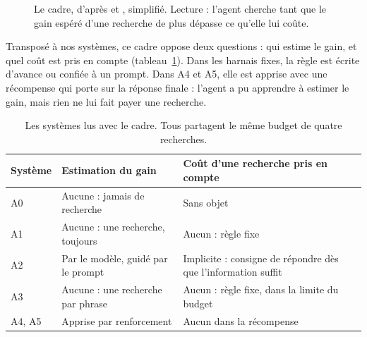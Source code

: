 \begin{figure}[ht]
\centering
{}
\caption{Le cadre, d'après \citet{pirolli1999information} et \citet{stigler1961economics}, simplifié. Lecture : l'agent cherche tant que le gain espéré d'une recherche de plus dépasse ce qu'elle lui coûte.}
\label{fig:cadre}
\end{figure}

Transposé à nos systèmes, ce cadre oppose deux questions : qui estime le gain, et quel coût est pris en compte (tableau~\ref{tab:cadre}). Dans les harnais fixes, la règle est écrite d'avance ou confiée à un prompt. Dans A4 et A5, elle est apprise avec une récompense qui porte sur la réponse finale \citep{jin2025search} : l'agent a pu apprendre à estimer le gain, mais rien ne lui fait payer une recherche.

\begin{table}[ht]
\centering\small
\begin{tabular}{@{}lp{5.6cm}p{5.6cm}@{}}
\toprule
Système & Estimation du gain & Coût d'une recherche pris en compte\\
\midrule
A0 & Aucune : jamais de recherche & Sans objet\\
A1 & Aucune : une recherche, toujours & Aucun : règle fixe\\
A2 & Par le modèle, guidé par le prompt & Implicite : consigne de répondre dès que l'information suffit\\
A3 & Aucune : une recherche par phrase & Aucun : règle fixe, dans la limite du budget\\
A4, A5 & Apprise par renforcement & Aucun dans la récompense\\
\bottomrule
\end{tabular}
\caption{Les systèmes lus avec le cadre. Tous partagent le même budget de quatre recherches.}
\label{tab:cadre}
\end{table}


